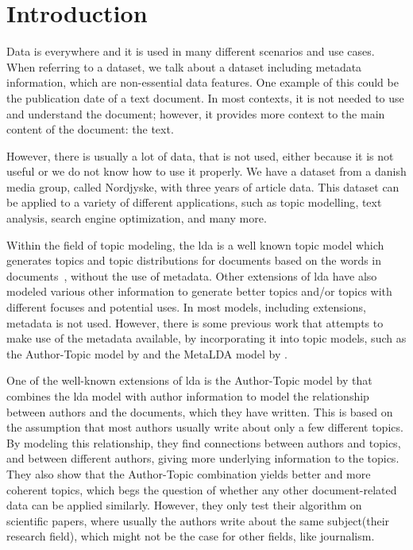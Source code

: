 \section{Introduction}\label{sec:introduction}
Data is everywhere and it is used in many different scenarios and use cases. 
When referring to a dataset, we talk about a dataset including metadata information, which are non-essential data features.
One example of this could be the publication date of a text document. 
In most contexts, it is not needed to use and understand the document; however, it provides more context to the main content of the document: the text.

However, there is usually a lot of data, that is not used, either because it is not useful or we do not know how to use it properly.
We have a dataset from a danish media group, called Nordjyske, with three years of article data.
This dataset can be applied to a variety of different applications, such as topic modelling\cite{blei2003latent}\cite{MetaLDA2017}, text analysis\cite{baly2020written}, search engine optimization\cite{amjad2015topic}, and many more.

Within the field of topic modeling, the \Gls{lda} is a well known topic model which generates topics and topic distributions for documents based on the words in documents~\cite{blei2003latent}, without the use of metadata.
Other extensions of \gls{lda} have also modeled various other information to generate better topics and/or topics with different focuses and potential uses.
In most models, including extensions, metadata is not used.
However, there is some previous work that attempts to make use of the metadata available, by incorporating it into topic models, such as the Author-Topic model by \citet{author_topic_2012} and the MetaLDA model by \citet{MetaLDA2017}.

One of the well-known extensions of \gls{lda} is the Author-Topic model by \citet{author_topic_2012} that combines the \gls{lda} model with author information to model the relationship between authors and the documents, which they have written.
This is based on the assumption that most authors usually write about only a few different topics.
By modeling this relationship, they find connections between authors and topics, and between different authors, giving more underlying information to the topics.
They also show that the Author-Topic combination yields better and more coherent topics, which begs the question of whether any other document-related data can be applied similarly.
However, they only test their algorithm on scientific papers, where usually the authors write about the same subject(their research field), which might not be the case for other fields, like journalism. 

